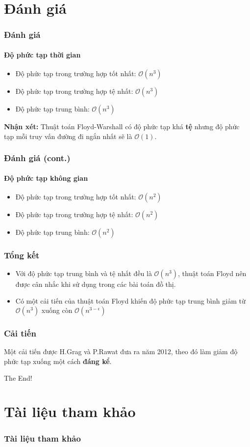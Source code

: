 \documentclass[12pt]{beamer}
\begin{document}
    \section{Đánh giá}
    \begin{frame}[t]

        \frametitle{Đánh giá}
        \framesubtitle{Độ phức tạp thời gian}
        \begin{itemize}
            \item Độ phức tạp trong trường hợp tốt nhất: $\mathcal{O}(n^3)$
            \item Độ phức tạp trong trường hợp tệ nhất: $\mathcal{O}(n^3)$
            \item Độ phức tạp trung bình: $\mathcal{O}(n^3)$
        \end{itemize}
        \textbf{Nhận xét:} Thuật toán Floyd-Warshall có độ phức tạp khá \textbf{tệ} nhưng độ phức tạp mỗi truy vấn đường đi ngắn nhất sẽ là $\mathcal{O}(1)$.
    \end{frame}

    \begin{frame}[t]
        \frametitle{Đánh giá (cont.)}
        \framesubtitle{Độ phức tạp không gian}
        \begin{itemize}
            \item Độ phức tạp trong trường hợp tốt nhất: $\mathcal{O}(n^2)$
            \item Độ phức tạp trong trường hợp tệ nhất: $\mathcal{O}(n^2)$
            \item Độ phức tạp trung bình: $\mathcal{O}(n^2)$
        \end{itemize}
    \end{frame}

    \begin{frame}
        \frametitle{Tổng kết}
        \begin{itemize}
            \item Với độ phức tạp trung bình và tệ nhất đều là $\mathcal{O}(n^3)$, thuật toán Floyd nên được cân nhắc khi sử dụng trong các bài toán đồ thị.
            \item Có một cải tiến của thuật toán Floyd khiến độ phức tạp trung bình giảm từ $\mathcal{O}(n^3)$ xuống còn $\mathcal{O}(n^{3 - \epsilon})$
        \end{itemize}
    \end{frame}

    \begin{frame}[t]
        \frametitle{Cải tiến}
        Một cải tiến được H.Grag và P.Rawat đưa ra năm 2012\cite{improve:article}, theo đó làm giảm độ phức tạp xuống một cách \textbf{đáng kể}.
    \end{frame}

    \begin{frame}
        \Large \centering
        The End!
    \end{frame}

    \section{Tài liệu tham khảo}
    \begin{frame}[t]
        \frametitle{Tài liệu tham khảo}

        
        
    \end{frame}
\end{document}

